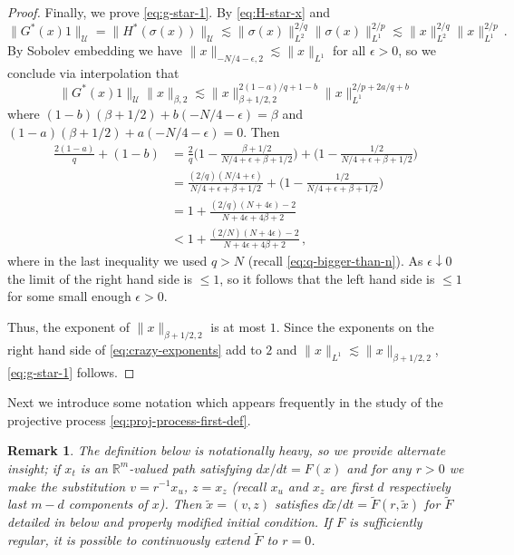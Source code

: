 \documentclass[final]{amsart}
\newtheorem{rem}[thm]{Remark}
\numberwithin{thm}{section}
\numberwithin{equation}{section}
\newcommand{\U}{\mathcal{U}}
\newcommand{\R}{\mathbb{R}}
\begin{document}
\begin{proof}
Finally, we prove \eqref{eq:g-star-1}. By \eqref{eq:H-star-x}
and 
    $$
    \|G^*(x) 1\|_\U 
    = \|H^*(\sigma(x))\|_\U 
    \lesssim
    \|\sigma(x)\|_{L^2}^{2/q}\|\sigma(x)\|_{L^1}^{2/p}
    \lesssim \|x\|_{L^2}^{2/q}\|x\|_{L^1}^{2/p} \,.
    $$
    By Sobolev embedding we have $\|x\|_{-N/4-\epsilon,2} \lesssim \|x\|_{L^1}$ for all $\epsilon > 0$, so we conclude via interpolation that
    \begin{equation}\label{eq:crazy-exponents}
        \|G^*(x)1\|_\U\|x\|_{\beta,2} \lesssim \|x\|_{\beta+1/2,2}^{2(1-a)/q+1-b}\|x\|_{L^1}^{2/p + 2a/q +b}
    \end{equation}
    where $(1-b)(\beta+1/2) + b(-N/4-\epsilon) = \beta$ and $(1-a)(\beta+1/2) + a(-N/4-\epsilon) = 0$. Then
    \begin{align*}
        \frac{2(1-a)}{q} + (1-b) &= \frac{2}{q}\Big(1-\frac{\beta+1/2}{N/4+\epsilon+\beta+1/2}\Big) + \Big(1-\frac{1/2}{N/4+\epsilon+\beta+1/2}\Big)\\
        &= \frac{(2/q)(N/4+\epsilon)}{N/4+\epsilon+\beta+1/2} + \Big(1-\frac{1/2}{N/4+\epsilon+\beta+1/2}\Big) \\
        &= 1+\frac{(2/q)(N+4\epsilon) - 2}{N+4\epsilon+4\beta+2} \\
        &< 1 + \frac{(2/N)(N+4\epsilon)-2}{N+4\epsilon+4\beta+2}\,,
    \end{align*}
    where in the last inequality we used $q>N$ (recall \eqref{eq:q-bigger-than-n}). As $\epsilon \downarrow 0$ the limit of the right hand side is $\leq 1$, so it follows that the left hand side is $\leq 1$ for some small enough $\epsilon > 0$.
    
    
    Thus, the exponent of $\|x\|_{\beta+1/2,2}$ is at most $1$. Since the exponents on the right hand side of \eqref{eq:crazy-exponents} add to $2$ and $\|x\|_{L^1} \lesssim \|x\|_{\beta+1/2,2}$, \eqref{eq:g-star-1} follows.
\end{proof}

Next we introduce some notation which appears frequently in the study of the projective process \eqref{eq:proj-process-first-def}.

\begin{rem}\label{rem:heavy-notation}
    The definition below is notationally heavy, so we provide alternate insight; if $x_t$ is an $\R^m$-valued path satisfying $dx/dt = F(x)$ and for any $r > 0$ we make the substitution $v = r^{-1}x_u$, $z = x_z$ (recall $x_u$ and $x_z$ are first $d$ respectively last $m -d$ components of $x$).  Then 
    $\tilde x = (v,z)$ satisfies $d\tilde x/dt = \tilde F(r,\tilde x)$ for $\tilde F$ detailed in  below and properly modified initial condition. If $F$ is sufficiently regular,  it is possible to continuously extend $\tilde{F}$ to $r = 0$.
    
    
\end{rem}
\end{document}
